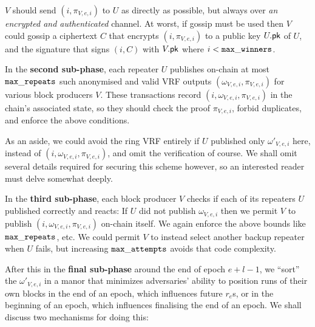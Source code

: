 $V$ should send $(i,\pi_{V,e,i})$ to $U$ as directly as possible, but always over \emph{an encrypted and authenticated} channel.  At worst, if gossip must be used then $V$ could gossip a ciphertext $C$ that encrypts $(i,\pi_{V,e,i})$ to a public key $U.\mathsf{pk}$ of $U$, and the signature that signs $(i,C)$ with $V.\mathsf{pk}$ where $i < \mathtt{max\_winners}$.




In the {\bf second sub-phase}, each repeater $U$ publishes on-chain at most $\mathtt{max\_repeats}$ such anonymised and valid VRF outputs $(\omega_{V,e,i},\pi_{V,e,i})$ for various block producers $V$.  These transactions record $(i,\omega_{V,e,i},\pi_{V,e,i})$ in the chain's associated state, so they should check the proof $\pi_{V,e,i}$, forbid duplicates, and enforce the above conditions.

As an aside, we could avoid the ring VRF entirely if $U$ published only $\omega'_{V,e,i}$ here, instead of $(i,\omega_{V,e,i},\pi_{V,e,i})$, and omit the verification of course.  We shall omit several details required for securing this scheme however, so an interested reader must delve somewhat deeply.

In the {\bf third sub-phase}, each block producer $V$ checks if each of its repeaters $U$ published correctly and reacts:  If $U$ did not publish $\omega_{V,e,i}$ then we permit $V$ to publish $(i,\omega_{V,e,i},\pi_{V,e,i})$ on-chain itself.  We again enforce the above bounds like $\mathtt{max\_repeats}$, etc.  We could permit $V$ to instead select another backup repeater when $U$ fails, but increasing $\mathtt{max\_attempts}$ avoids that code complexity.

After this in the {\bf final sub-phase} around the end of epoch $e+l-1$, we ``sort'' the $\omega'_{V,e,i}$ in a manor that minimizes adversaries' ability to position runs of their own blocks in the end of an epoch, which influences future $r_e$s, or in the beginning of an epoch, which influences finalising the end of an epoch.  We shall discuss two mechanisms for doing this: 

